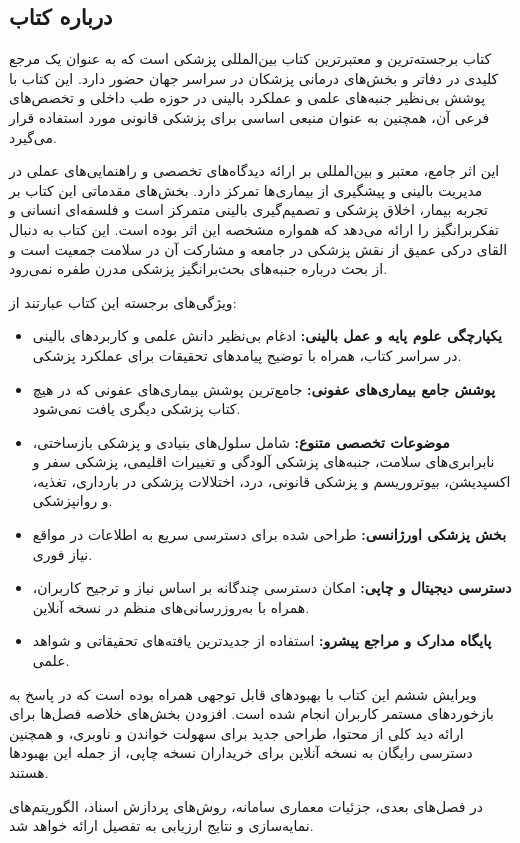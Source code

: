 \subsection{درباره کتاب }
کتاب  برجسته‌ترین و معتبرترین کتاب بین‌المللی پزشکی است که به عنوان یک مرجع کلیدی در دفاتر و بخش‌های درمانی پزشکان در سراسر جهان حضور دارد. این کتاب با پوشش بی‌نظیر جنبه‌های علمی و عملکرد بالینی در حوزه طب داخلی و تخصص‌های فرعی آن، همچنین به عنوان منبعی اساسی برای پزشکی قانونی مورد استفاده قرار می‌گیرد.

این اثر جامع، معتبر و بین‌المللی بر ارائه دیدگاه‌های تخصصی و راهنمایی‌های عملی در مدیریت بالینی و پیشگیری از بیماری‌ها تمرکز دارد. بخش‌های مقدماتی این کتاب بر تجربه بیمار، اخلاق پزشکی و تصمیم‌گیری بالینی متمرکز است و فلسفه‌ای انسانی و تفکربرانگیز را ارائه می‌دهد که همواره مشخصه این اثر بوده است. این کتاب به دنبال القای درکی عمیق از نقش پزشکی در جامعه و مشارکت آن در سلامت جمعیت است و از بحث درباره جنبه‌های بحث‌برانگیز پزشکی مدرن طفره نمی‌رود.

\noindent
ویژگی‌های برجسته این کتاب عبارتند از:

\begin{itemize}
    \item \textbf{یکپارچگی علوم پایه و عمل بالینی:} ادغام بی‌نظیر دانش علمی و کاربردهای بالینی در سراسر کتاب، همراه با توضیح پیامدهای تحقیقات برای عملکرد پزشکی.
    
    \item \textbf{پوشش جامع بیماری‌های عفونی:} جامع‌ترین پوشش بیماری‌های عفونی که در هیچ کتاب پزشکی دیگری یافت نمی‌شود.
    
    \item \textbf{موضوعات تخصصی متنوع:} شامل سلول‌های بنیادی و پزشکی بازساختی، نابرابری‌های سلامت، جنبه‌های پزشکی آلودگی و تغییرات اقلیمی، پزشکی سفر و اکسپدیشن، بیوتروریسم و پزشکی قانونی، درد، اختلالات پزشکی در بارداری، تغذیه، و روانپزشکی.
    
    \item \textbf{بخش پزشکی اورژانسی:} طراحی شده برای دسترسی سریع به اطلاعات در مواقع نیاز فوری.
    
    \item \textbf{دسترسی دیجیتال و چاپی:} امکان دسترسی چندگانه بر اساس نیاز و ترجیح کاربران، همراه با به‌روزرسانی‌های منظم در نسخه آنلاین.
    
    \item \textbf{پایگاه مدارک و مراجع پیشرو:} استفاده از جدیدترین یافته‌های تحقیقاتی و شواهد علمی.
\end{itemize}

\noindent
ویرایش ششم این کتاب با بهبودهای قابل توجهی همراه بوده است که در پاسخ به بازخوردهای مستمر کاربران انجام شده است. افزودن بخش‌های خلاصه فصل‌ها برای ارائه دید کلی از محتوا، طراحی جدید برای سهولت خواندن و ناوبری، و همچنین دسترسی رایگان به نسخه آنلاین  برای خریداران نسخه چاپی، از جمله این بهبودها هستند.

\noindent
در فصل‌های بعدی، جزئیات معماری سامانه، روش‌های پردازش اسناد، الگوریتم‌های نمایه‌سازی و نتایج ارزیابی به تفصیل ارائه خواهد شد.
